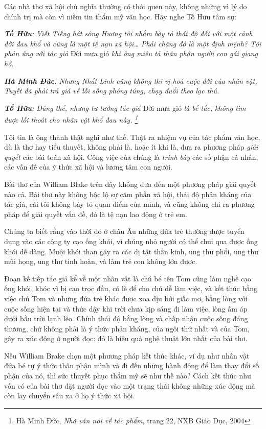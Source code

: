 \documentclass[../main.tex]{subfiles}
\begin{document}
\begin{multicols}{2}
Các nhà thơ xã hội chủ nghĩa thường có thói quen này, không những vì lý do chính trị mà còn vì niềm tin thẩm mỹ văn học. Hãy nghe Tố Hữu tâm sự: 
 
\textit{\textbf{Tố Hữu}: Viết Tiếng hát sông Hương tôi nhằm bày tỏ thái độ đối với một cảnh đời đau khổ và cũng là một tệ nạn xã hội… Phải chăng đó là một định mệnh? Tôi phản ứng với tác giả }Đời mưa gió\textit{ khi ông miêu tả thân phận người con gái giang hồ.} 
 
\textit{\textbf{Hà Minh Đức}: Nhưng Nhất Linh cũng không thi vị hoá cuộc đời của nhân vật, Tuyết đã phải trả giá về lối sống phóng túng, chạy đuổi theo lạc thú.} 
 
\textit{\textbf{Tố Hữu}: Đúng thế, nhưng tư tưởng tác giá }Đời mưa gió\textit{ là bế tắc, không tìm được lối thoát cho nhân vật khổ đau này. \footnote{
Hà Minh Đức, \textit{Nhà văn nói về tác phẩm}, trang 22, NXB Giáo Dục, 2004} } 
 
Tôi tin là ông thành thật nghĩ như thế. Thật ra nhiệm vụ của tác phẩm văn học, dù là thơ hay tiểu thuyết, không phải là, hoặc ít khi là, đưa ra phương pháp \textit{giải quyết} các bài toán xã hội. Công việc của chúng là \textit{trình bày} các số phận cá nhân, các vấn đề của ý thức xã hội và lương tâm con người.  
 
Bài thơ của William Blake trên đây không đưa đến một phương pháp giải quyết nào cả. Bài thơ này không bộc lộ sự căm phẫn xã hội, thái độ phản kháng của tác giả, cái tôi không bày tỏ quan điểm của mình, và cũng không chỉ ra phương pháp để giải quyềt vấn đề, đó là tệ nạn lao động ở trẻ em. 
 
Chúng ta biết rằng vào thời đó ở châu Âu những đứa trẻ thường được tuyển dụng vào các công ty cạo ống khói, vì chúng nhỏ người có thể chui qua được ống khói dễ dàng. Muội khói than gây ra các dị tật thần kinh, ung thư phổi, ung thư mũi họng, ung thư tinh hoàn, và làm trẻ con không lớn được.  
 
Đoạn kế tiếp tác giả kể về một nhân vật là chú bé tên Tom cũng làm nghề cạo ống khói, khóc vì bị cạo trọc đầu, có lẽ để cho chú dễ làm việc, và kết thúc bằng việc chú Tom và những đứa trẻ khác được xoa dịu bởi giấc mơ, bằng lòng với cuộc sống hiện tại và thức dậy khi trời chưa kịp sáng đi làm việc, lòng ấm áp dưới bầu trời lạnh lẽo. Chính thái độ bằng lòng và chấp nhận cuộc sống đáng thương, chứ không phải là ý thức phản kháng, của ngôi thứ nhất và của Tom, gây ra xúc động ở người đọc: đó là hiệu quả nghệ thuật lớn nhất của bài thơ. 
 
Nếu William Brake chọn một phương pháp kết thúc khác, ví dụ như nhân vật đứa bé tự ý thức thân phận mình và đi đến những hành động để làm thay đổi số phận của nó, thì sức thuyết phục thẩm mỹ sẽ như thế nào? Cách kết thúc như vốn có của bài thơ đặt người đọc vào một trạng thái không những xúc động mà còn lay chuyển sâu xa ở họ ý thức xã hội.  
 

\end{multicols}
\end{document}
